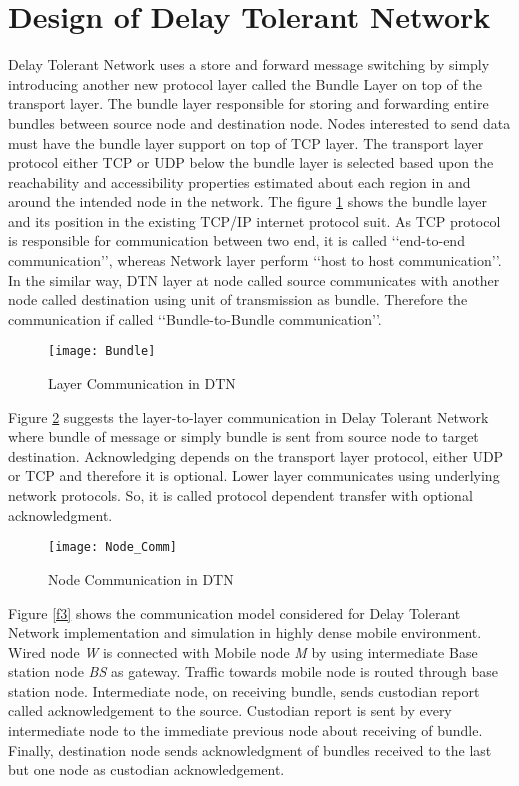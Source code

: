 \documentclass[3p,times]{elsarticle}
\begin{document}
\section{Design of Delay Tolerant Network}\label{des}
Delay Tolerant Network uses a store and forward message switching by simply introducing another new protocol layer called the Bundle Layer on top of the transport layer. The bundle layer responsible for storing and forwarding entire bundles between source node and destination node. Nodes interested to send data must have the bundle layer support on top of TCP layer.  The transport layer protocol either TCP or UDP below the bundle layer is selected based upon the reachability and accessibility properties estimated about each region in and around the intended node in the network. The figure \ref{f1} shows the bundle layer and its position in the existing TCP/IP internet protocol suit. As TCP protocol is responsible for communication between two end, it is called \lq\lq end-to-end communication\rq\rq , whereas Network layer perform \lq\lq host to host communication\rq\rq. In the similar way, DTN layer at node called source communicates with another node called destination using unit of transmission as bundle. Therefore the communication if called \lq\lq Bundle-to-Bundle communication\rq\rq. 
\begin{figure}[h]
\centering
\mbox{\texttt{[image: Bundle]}}
\caption{Layer Communication in DTN}
\label{f1}
\end{figure}
Figure \ref{f2} suggests the layer-to-layer communication in Delay Tolerant Network where bundle of message or simply bundle is sent from source node to target destination. Acknowledging depends on the transport layer protocol, either UDP or TCP and therefore it is optional. Lower layer communicates using underlying network protocols. So, it is called protocol dependent transfer with optional acknowledgment.
\begin{figure}[h]
\centering
\mbox{\texttt{[image: Node\_Comm]}}
\caption{Node Communication in DTN}
\label{f2}
\end{figure}
Figure \ref{f3} shows the communication model considered for Delay Tolerant Network implementation and simulation in highly dense mobile environment. Wired node \emph {W} is connected with Mobile node \emph {M} by using intermediate Base station node \emph {BS} as gateway. Traffic towards mobile node is routed through base station node. Intermediate node, on receiving bundle, sends custodian report called acknowledgement to the source. Custodian report is sent by every intermediate node to the immediate previous node about receiving of bundle. Finally, destination node sends acknowledgment of bundles received to the last but one node as custodian acknowledgement.
\end{document}
